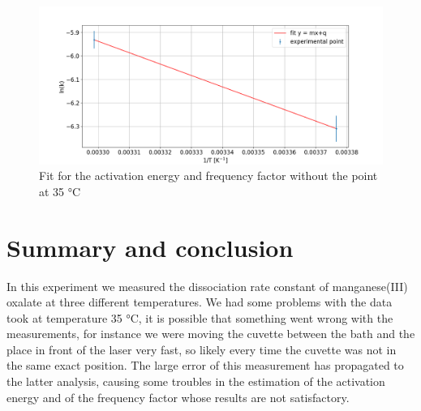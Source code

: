 \documentclass[a4paper,10pt]{article}
\begin{document}
\begin{figure}[H]
\centering
\includegraphics[width=\textwidth]{energy2}
\caption{Fit for the activation energy and frequency factor without the point at 35 °C}\label{energy2}
\end{figure}
\section{Summary and conclusion}
In this experiment we measured the dissociation rate constant of manganese(III) oxalate at three different temperatures. We had some problems with the data took at temperature 35 °C, it is possible that something went wrong with the measurements, for instance we were moving the cuvette between the bath and the place in front of the laser very fast, so likely every time the cuvette was not in the same exact position. The large error of this measurement has propagated to the latter analysis, causing some troubles in the estimation of the activation energy and of the frequency factor whose results are not satisfactory. 
\end{document}
